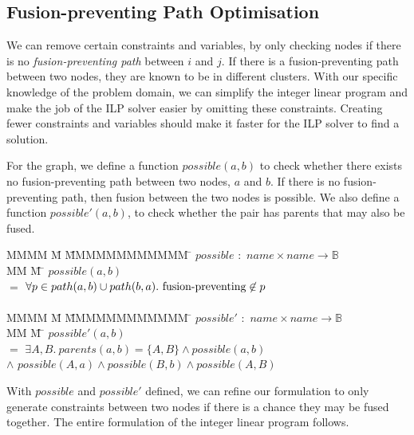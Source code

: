 \subsection{Fusion-preventing Path Optimisation}
\label{s:OptimisedConstraints}
We can remove certain constraints and variables, by only checking nodes if there is no \emph{fusion-preventing path} between $i$ and $j$.
If there is a fusion-preventing path between two nodes, they are known to be in different clusters.
With our specific knowledge of the problem domain, we can simplify the integer linear program and make the job of the ILP solver easier by omitting these constraints.
Creating fewer constraints and variables should make it faster for the ILP solver to find a solution.

For the graph, we define a function $possible(a,b)$ to check whether there exists no fusion-preventing path between two nodes, $a$ and $b$.
If there is no fusion-preventing path, then fusion between the two nodes is possible.
We also define a function $possible'(a,b)$, to check whether the pair has parents that may also be fused.

\begin{tabbing}
MMMM \= M \=     \= MMMMMMMMMMMM    \=  \kill
$possible$ \> $:$     \> $name \times name \to \mathbb{B}$      \\
MM        \= M    \= \kill
$possible(a,b)$ \\
    \>$=$  \>$\forall p \in path(a,b) \cup path(b,a).\ \fusionpreventing \not\in p$\\
\\
MMMM \= M \=     \= MMMMMMMMMMMM    \=  \kill
$possible'$     \> $:$ \> $name \times name \to \mathbb{B}$      \\
MM        \= M    \= \kill
$possible'(a,b)$ \\
    \>$=$  \>$\exists A, B.\  parents(a,b) = \{A,B\} \wedge possible(a,b)$ \\
    \>$\wedge$ \> $possible(A,a) \wedge possible(B,b) \wedge possible(A,B)$
\end{tabbing}

With $possible$ and $possible'$ defined, we can refine our formulation to only generate constraints between two nodes if there is a chance they may be fused together.
The entire formulation of the integer linear program follows.

